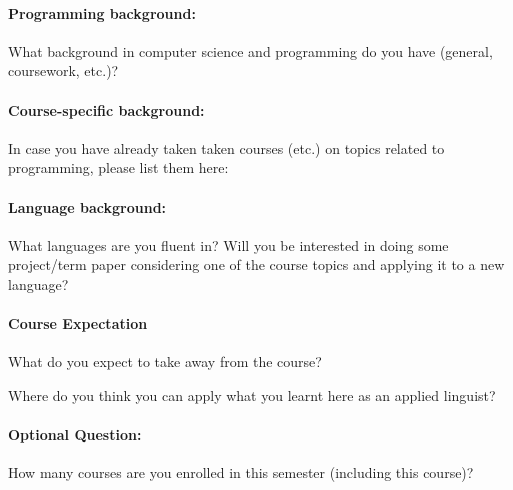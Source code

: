 \documentclass{article}
\begin{document}
\vfill\vfill


\paragraph{Programming background:}
What background in computer science and programming
do you have (general, coursework, etc.)?

\vfill\mbox{}

\paragraph{Course-specific background:}
In case you have already taken taken courses (etc.) on topics related
to programming, please list them here:


\vfill\mbox{}

\paragraph{Language background:}
What languages are you fluent in? Will you be interested in doing some project/term paper considering one of the course topics and applying it to a new language? 


\vfill\mbox{}

\paragraph{Course Expectation}
What do you expect to take away from the course? 
\vfill\vfill

Where do you think you can apply what you learnt here as an applied linguist?

\vfill\vfill

\paragraph{Optional Question:}
How many courses are you enrolled in this semester (including this course)? 
\end{document}
